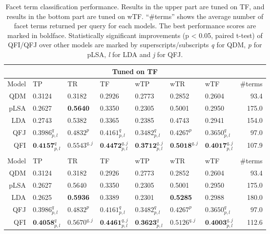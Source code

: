 \begin{table}[ht!]
\centering
\caption{Facet term classification performance. Results in the upper part are tuned on TF, and results in the bottom part are tuned on wTF. ``\#terms'' shows the average number of facet terms returned per query for each models. The best performance scores are marked in boldface. Statistically significant improvements (p < 0.05, paired t-test) of QFI/QFJ over other models are marked by superscripts/subscripts \textit{q} for QDM, \textit{p} for pLSA, \textit{l} for LDA and \textit{j} for QFJ.}
\label{tab:intrinsic-tf}
\setlength\tabcolsep{4pt}
\begin{tabular}{|r|l|l|l|l|l|l|r|} \hline
\multicolumn{8}{|c|}{Tuned on TF} \\\hline
Model& TP & TR & TF & wTP & wTR & wTF & \#terms \\ \hline
QDM & 0.3124 & 0.3182 & 0.2926 & 0.2773 & 0.2852 & 0.2604 & 93.4 \\\hline
pLSA & 0.2627 & \textbf{0.5640} & 0.3350 & 0.2305 & 0.5001 & 0.2950 & 175.0 \\ \hline
LDA & 0.2743 & 0.5382 & 0.3365 & 0.2385 & 0.4743 & 0.2941 & 154.0 \\ \hline
QFJ & $0.3986^{q}_{p,l}$ & $0.4832^{p}$ & $0.4161^{q}_{p,l}$ & $0.3482^{q}_{p,l}$ & $0.4267^{p}$ & $0.3650^{q}_{p,l}$ & 97.0 \\ \hline
QFI & $\textbf{0.4157}^{q}_{p,l}$ & $0.5543^{q,j}$ & $\textbf{0.4472}^{q,j}_{p,l}$ & $\textbf{0.3712}^{q,j}_{p,l}$ & $\textbf{0.5018}^{q,j}$ & $\textbf{0.4017}^{q,j}_{p,l}$ & 107.9 \\ 
\hhline{|========|}
\multicolumn{8}{|c|}{Tuned on wTF} \\\hline
Model& TP & TR & TF & wTP & wTR & wTF & \#terms \\ \hline
QDM & 0.3124 & 0.3182 & 0.2926 & 0.2773 & 0.2852 & 0.2604 & 93.4 \\ \hline
pLSA & 0.2627 & 0.5640 & 0.3350 & 0.2305 & 0.5001 & 0.2950 & 175.0 \\ \hline
LDA & 0.2625 & \textbf{0.5936} & 0.3389 & 0.2301 & \textbf{0.5285} & 0.2988 & 180.0 \\ \hline
QFJ & $0.3986^{q}_{p,l}$ & $0.4832^{p}$ & $0.4161^{q}_{p,l}$ & $0.3482^{q}_{p,l}$ & $0.4267^{p}$ & $0.3650^{q}_{p,l}$ & 97.0 \\ \hline
QFI & $\textbf{0.4058}^{q}_{p,l}$ & $0.5670^{q,j}$ & $\textbf{0.4461}^{q,j}_{p,l}$ & $\textbf{0.3623}^{q}_{p,l}$ & $0.5126^{q,j}$ & $\textbf{0.4003}^{q,j}_{p,l}$ & 112.6 \\ \hline
\end{tabular}
\end{table}


